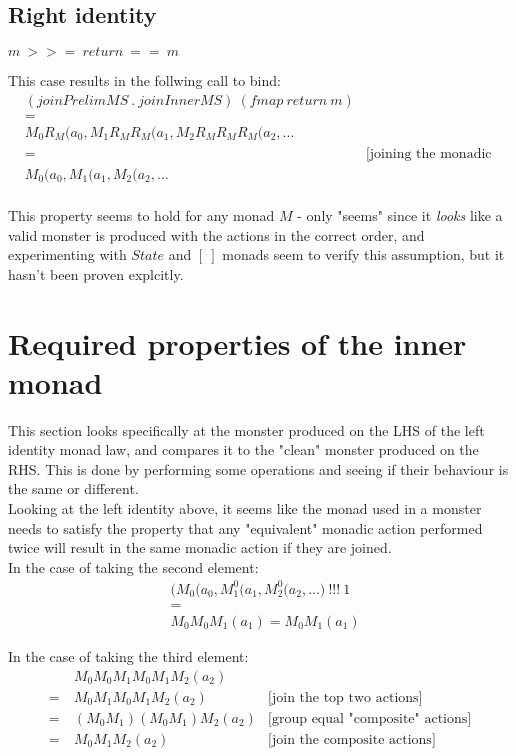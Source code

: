 \documentclass{article}
\begin{document}
\subsection{Right identity}
$m\ >>=\ return\ ==\ m$

This case results in the follwing call to bind:\\
\begin{align*}
	&(joinPrelimMS\ .\ joinInnerMS)\ (fmap\ return\ m) \\
	&=\\
	&M_0R_M ( a_0, M_1R_MR_M (a_1, M_2R_MR_MR_M (a_2, ...\\
	&= &\text{[joining the monadic actions]}\\
	&M_0 ( a_0, M_1 ( a_1, M_2 ( a_2, ... \\
\end{align*}

This property seems to hold for any monad $M$ - only "seems" since it \textit{looks} like a valid monster is produced with the actions in the correct order, and experimenting with $ State $ and $ [\ ] $ monads seem to verify this assumption, but it hasn't been proven explcitly.

\section{Required properties of the inner monad}

This section looks specifically at the monster produced on the LHS of the left identity monad law, and compares it to the "clean" monster produced on the RHS. This is done by performing some operations and seeing if their behaviour is the same or different.\\

Looking at the left identity above, it seems like the monad used in a monster needs to satisfy the property that any "equivalent" monadic action performed twice will result in the same monadic action if they are joined.\\

In the case of taking the second element:
\begin{align*}
 & \big(M_0 ( a_0, M^0_1 ( a_1, M^0_2 ( a_2, ... \big)\ !!!\ 1\\
 &=\\
	& M_0M_0M_1 (a_1) = M_0M_1 (a_1)
\end{align*}

In the case of taking the third element:
\begin{align*}
& M_0M_0M_1M_0M_1M_2 (a_2) \\
=\ & M_0M_1M_0M_1M_2 (a_2) & \text{[join the top two actions]}\\
=\ & (M_0M_1)(M_0M_1)M_2 (a_2) & \text{[group equal "composite" actions]}\\
=\ & M_0M_1M_2 (a_2) & \text{[join the composite actions]}\\
\end{align*}
\end{document}
